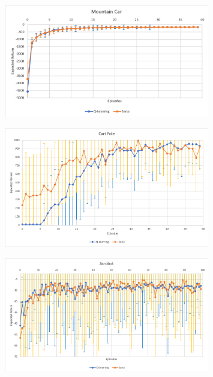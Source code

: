 \documentclass[]{article}
\begin{document}
\begin{enumerate}
    \begin{figure}[h!]
    	\hspace*{0.1\textwidth}\includegraphics[width=0.8\textwidth]{MountainCar.png}
    	\label{fig: Learning Curve - Mountain Car}
	\end{figure}
	\begin{figure}
		\hspace*{0.1\textwidth}\includegraphics[width=0.8\textwidth, ]{CartPole.png}
		\label{fig: Learning Curve - CartPole}
	\end{figure}
	\begin{figure}
		\hspace*{0.1\textwidth}\includegraphics[width=0.8\textwidth]{Acrobot.png}
		\label{fig: Learning Curve - Acrobot}
	\end{figure}

\end{enumerate}
\end{document}
